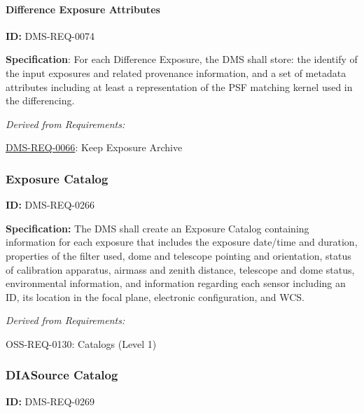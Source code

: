 \documentclass[SE,toc,lsstdraft]{lsstdoc}
\begin{document}
\paragraph{Difference Exposure Attributes}\hfill  %

\label{DMS-REQ-0074}
\textbf{ID:} DMS-REQ-0074

\textbf{Specification}: For each Difference Exposure, the DMS shall store: the identify of the input exposures and related provenance information, and a set of metadata attributes including at least a representation of the PSF matching kernel used in the differencing.






\emph{Derived from Requirements:}

\hyperref[DMS-REQ-0066]{DMS-REQ-0066}:
Keep Exposure Archive \newline


\subsubsection{Exposure Catalog}

\label{DMS-REQ-0266}
\textbf{ID:} DMS-REQ-0266

\textbf{Specification:} The DMS shall create an Exposure Catalog containing information for each exposure that includes the exposure date/time and duration, properties of the filter used, dome and telescope pointing and orientation, status of calibration apparatus, airmass and zenith distance, telescope and dome status, environmental information, and information regarding each sensor including an ID, its location in the focal plane, electronic configuration, and WCS.






\emph{Derived from Requirements:}

OSS-REQ-0130:
Catalogs (Level 1) \newline


\subsubsection{DIASource Catalog}

\label{DMS-REQ-0269}
\textbf{ID:} DMS-REQ-0269
\end{document}
